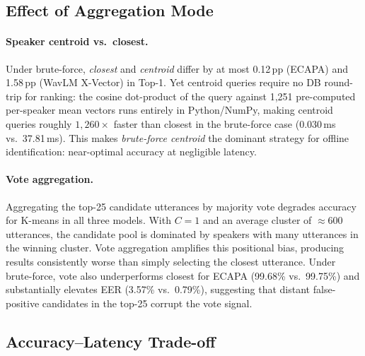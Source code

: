 \documentclass[12pt, a4paper]{article}
\begin{document}
\subsection{Effect of Aggregation Mode}
\label{sec:analysis_agg}

\paragraph{Speaker centroid vs.\ closest.}
Under brute-force, \emph{closest} and \emph{centroid} differ
by at most 0.12\,pp (ECAPA) and 1.58\,pp (WavLM X-Vector) in Top-1.
Yet centroid queries require no DB round-trip for ranking: the cosine
dot-product of the query against 1,251 pre-computed per-speaker mean
vectors runs entirely in Python/NumPy, making centroid queries roughly
$1{,}260{\times}$ faster than closest in the brute-force case
(0.030\,ms vs.\ 37.81\,ms).
This makes \emph{brute-force centroid} the dominant strategy for
offline identification: near-optimal accuracy at negligible latency.

\paragraph{Vote aggregation.}
Aggregating the top-25 candidate utterances by majority vote degrades
accuracy for K-means in all three models.
With $C{=}1$ and an average cluster of ${\approx}600$ utterances,
the candidate pool is dominated by speakers with many utterances in
the winning cluster.
Vote aggregation amplifies this positional bias, producing results
consistently worse than simply selecting the closest utterance.
Under brute-force, vote also underperforms closest for ECAPA
(99.68\% vs.\ 99.75\%) and substantially elevates EER (3.57\% vs.\
0.79\%), suggesting that distant false-positive candidates in the
top-25 corrupt the vote signal.

\subsection{Accuracy--Latency Trade-off}
\label{sec:analysis_tradeoff}
\end{document}
